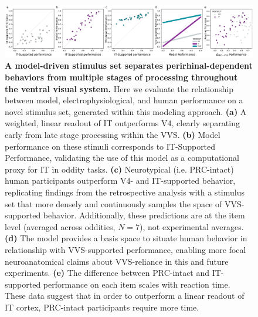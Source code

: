 \documentclass[11pt]{article}
\begin{document}
\begin{figure}[ht]
\centering
\includegraphics[width=\linewidth]{figures/F5}
\caption{\textbf{A model-driven stimulus set separates perirhinal-dependent behaviors from multiple stages of processing throughout the ventral visual system.} Here we evaluate the relationship between model, electrophysiological, and human performance on a novel stimulus set, generated within this modeling approach. \textbf{(a)} A weighted, linear readout of IT outperforms V4, clearly separating early from late stage processing within the VVS. \textbf{(b)} Model performance on these stimuli corresponds to IT-Supported Performance, validating the use of this model as a computational proxy for IT in oddity tasks. \textbf{(c)} Neurotypical (i.e. PRC-intact) human participants outperform V4- and IT-supported behavior, replicating findings from the retrospective analysis with a stimulus set that more densely and continuously samples the space of VVS-supported behavior. Additionally, these predictions are at the item level (averaged across oddities, $N=7$), not experimental averages. \textbf{(d)} The model provides a basis space to situate human behavior in relationship with VVS-supported performance, enabling more focal neuroanatomical claims about VVS-reliance in this and future experiments. \textbf{(e)} The difference between PRC-intact and IT-supported performance on each item scales with reaction time. These data suggest that in order to outperform a linear readout of IT cortex, PRC-intact participants require more time.}
\label{fig:novel_diagnostic}
\end{figure}
\end{document}
